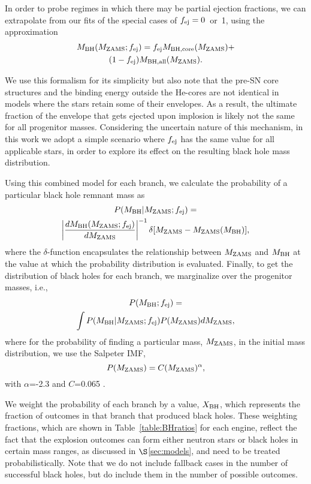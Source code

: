 \documentclass[]{emulateapj}
\newcommand{\Mb}{M_{\rm BH}}
\newcommand{\Mz}{M_{\rm ZAMS}}
\newcommand{\fe}{f_{\rm ej}}
\begin{document}
In order to probe regimes in which there may be partial ejection fractions, we can extrapolate from our fits of the special cases of $\fe=0$~or~1, using the approximation
\begin{multline}
\label{eq:Mb}
\Mb(\Mz; \fe) = \fe M_{\rm BH,core}(\Mz) + \\ (1 - \fe)M_{\rm BH,all}(\Mz).
\end{multline}

We use this formalism for its simplicity but also note that the pre-SN core structures and the binding energy outside the He-cores are not identical in models where the stars retain some of their envelopes. As a result, the ultimate fraction of the envelope that gets ejected upon implosion is likely not the same for all progenitor masses.  Considering the uncertain nature of this mechanism, in this work we adopt a simple scenario where $\fe$ has the same value for all applicable stars, in order to explore its effect on the resulting black hole mass distribution.

Using this combined model for each branch, we calculate the probability of a particular black hole remnant mass as
\begin{multline}
\label{eq:MBH}
P(\Mb | \Mz; \fe) =  \\ \left| \frac{d \Mb(\Mz; \fe)}{d \Mz} \right| ^{-1} \delta[\Mz - \Mz(\Mb)],
\end{multline}
where the $\delta$-function encapsulates the relationship between $\Mz$ and $\Mb$ at the value at which the probability distribution is evaluated.
Finally, to get the distribution of black holes for each branch, we marginalize over the progenitor masses, i.e.,
\begin{multline}
\label{eq:integral}
P(\Mb; \fe) = \\ \int P(\Mb | \Mz ; \fe) P(\Mz)  d\Mz,
\end{multline}
where for the probability of finding a particular mass, $\Mz$, in the initial mass distribution, we use the Salpeter IMF, 
\begin{equation}
\label{eq:IMF}
P(\Mz) = C (\Mz)^{\alpha},
\end{equation}
with $\alpha$=-2.3 and $C$=0.065 \citep{Salpeter1955}.

We weight the probability of each branch by a value, $X_{\rm BH}$, which represents the fraction of outcomes in that branch that produced black holes. These weighting fractions, which are shown in Table~\ref{table:BHratios} for each engine, reflect the fact that the explosion outcomes can form either neutron stars or black holes in certain mass ranges, as discussed in $\S$\ref{sec:models}, and need to be treated probabilistically. Note that we do not include fallback cases in the number of successful black holes, but do include them in the number of possible outcomes.
\end{document}
